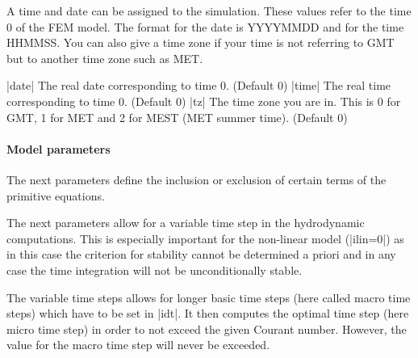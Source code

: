 A time and date can be assigned to the simulation. These values
refer to the time 0 of the FEM model. The format for the date is
YYYYMMDD and for the time HHMMSS.
You can also give a time zone if your time is not referring to
GMT but to another time zone such as MET.

|date|                The real date corresponding to time 0. (Default 0)
|time|                The real time corresponding to time 0. (Default 0)
|tz|                  The time zone you are in. This is 0 for GMT, 1 for MET
and 2 for MEST (MET summer time). (Default 0)


\paragraph{Model parameters}

The next parameters define the inclusion or exclusion of
certain terms of the primitive equations.

\par
{}
\par
{}
\par

The next parameters allow for a variable time step in the
hydrodynamic computations. This is especially important for the
non-linear model (|ilin=0|) as in this case the criterion
for stability cannot be determined a priori and in any case the
time integration will not be unconditionally stable.

The variable time steps allows for longer basic time steps
(here called macro time steps) which have to be set in |idt|.
It then computes the optimal time step (here micro time step)
in order to not exceed the given Courant number. However,
the value for the macro time step will never be exceeded.

